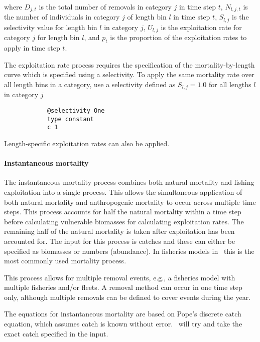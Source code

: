 where $D_{j,t}$ is the total number of removals in category $j$ in time step $t$, $N_{l,j,t}$ is the number of individuals in category $j$ of length bin $l$ in time step $t$, $S_{l,j}$ is the selectivity value for length bin $l$ in category $j$, $U_{l,j}$ is the exploitation rate for category $j$ for length bin $l$, and $p_t$ is the proportion of the exploitation rates to apply in time step $t$.

The exploitation rate process requires the specification of the mortality-by-length curve which is specified using a selectivity. To apply the same mortality rate over all length bins in a category, use a selectivity defined as $S_{l,j}=1.0$ for all lengths $l$ in category $j$

{\small{\begin{verbatim}
			@selectivity One
			type constant
			c 1
\end{verbatim}}}

Length-specific exploitation rates can also be applied. 

\paragraph{Instantaneous mortality}\label{sec:Process-MortalityInstantaneous}

The instantaneous mortality process combines both natural mortality and fishing exploitation into a single process. This allows the simultaneous application of both natural mortality and anthropogenic mortality to occur across multiple time steps. This process accounts for half the natural mortality within a time step before calculating vulnerable biomasses for calculating exploitation rates. The remaining half of the natural mortality is taken after exploitation has been accounted for. The input for this process is catches and these can either be specified as biomasses or numbers (abundance). In fisheries models in \CNAME\ this is the most commonly used mortality process.

This process allows for multiple removal events, e.g., a fisheries model with multiple fisheries and/or fleets. A removal method can occur in one time step only, although multiple removals can be defined to cover events during the year.

The equations for instantaneous mortality are based on Pope's discrete catch equation, which assumes catch is known without error. \CNAME\ will try and take the exact catch specified in the input.

